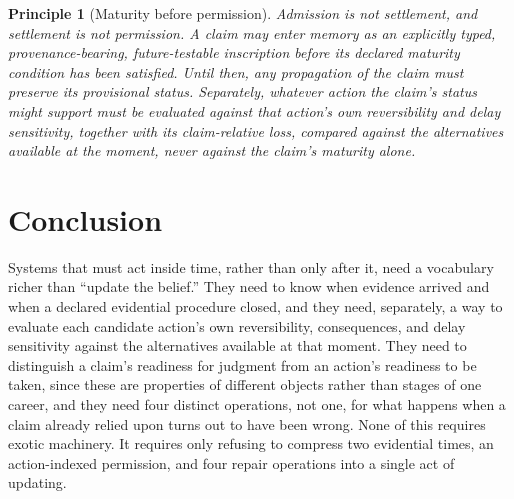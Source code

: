 \documentclass[11pt]{article}
\newtheorem{principle}{Principle}
\begin{document}
\begin{principle}[Maturity before permission]
Admission is not settlement, and settlement is not permission. A claim may enter memory as an explicitly typed, provenance-bearing, future-testable inscription before its declared maturity condition has been satisfied. Until then, any propagation of the claim must preserve its provisional status. Separately, whatever action the claim's status might support must be evaluated against that action's own reversibility and delay sensitivity, together with its claim-relative loss, compared against the alternatives available at the moment, never against the claim's maturity alone.
\end{principle}

\section{Conclusion}

Systems that must act inside time, rather than only after it, need a vocabulary richer than ``update the belief.'' They need to know when evidence arrived and when a declared evidential procedure closed, and they need, separately, a way to evaluate each candidate action's own reversibility, consequences, and delay sensitivity against the alternatives available at that moment. They need to distinguish a claim's readiness for judgment from an action's readiness to be taken, since these are properties of different objects rather than stages of one career, and they need four distinct operations, not one, for what happens when a claim already relied upon turns out to have been wrong. None of this requires exotic machinery. It requires only refusing to compress two evidential times, an action-indexed permission, and four repair operations into a single act of updating.
\end{document}
